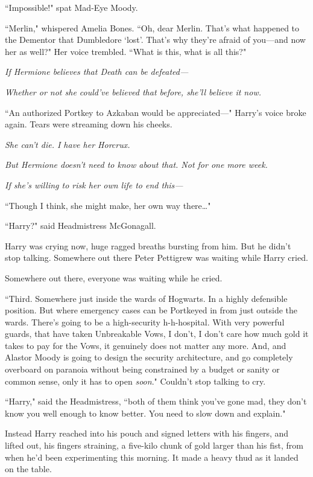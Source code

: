 ``Impossible!" spat Mad-Eye Moody.

``Merlin," whispered Amelia Bones. ``Oh, dear Merlin. That's what happened to the Dementor that Dumbledore `lost'. That's why they're afraid of you—and now her as well?" Her voice trembled. ``What is this, what is all this?"

\emph{If Hermione believes that Death can be defeated—}

\emph{Whether or not she could've believed that before, she'll believe it now.}

``An authorized Portkey to Azkaban would be appreciated—" Harry's voice broke again. Tears were streaming down his cheeks.

\emph{She can't die. I have her Horcrux.}

\emph{But Hermione doesn't need to know about that. Not for one more week.}

\emph{If she's willing to risk her own life to end this—}

``Though I think, she might make, her own way there{\ldots}"

``Harry?" said Headmistress McGonagall.

Harry was crying now, huge ragged breaths bursting from him. But he didn't stop talking. Somewhere out there Peter Pettigrew was waiting while Harry cried.

Somewhere out there, everyone was waiting while he cried.

``Third. Somewhere just inside the wards of Hogwarts. In a highly defensible position. But where emergency cases can be Portkeyed in from just outside the wards. There's going to be a high-security h-h-hospital. With very powerful guards, that have taken Unbreakable Vows, I don't, I don't care how much gold it takes to pay for the Vows, it genuinely does not matter any more. And, and Alastor Moody is going to design the security architecture, and go completely overboard on paranoia without being constrained by a budget or sanity or common sense, only it has to open \emph{soon}." Couldn't stop talking to cry.

``Harry," said the Headmistress, ``both of them think you've gone mad, they don't know you well enough to know better. You need to slow down and explain."

Instead Harry reached into his pouch and signed letters with his fingers, and lifted out, his fingers straining, a five-kilo chunk of gold larger than his fist, from when he'd been experimenting this morning. It made a heavy thud as it landed on the table.

